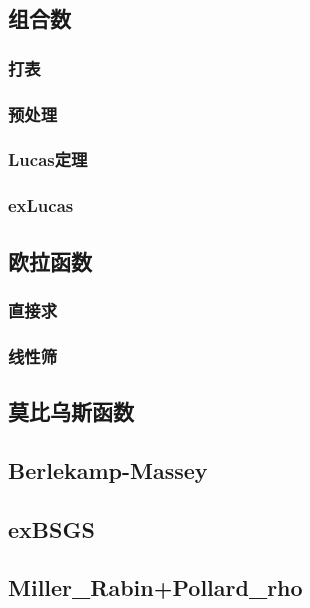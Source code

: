 ﻿\documentclass[a4paper,twocolumn]{article}
\begin{document}
\subsection{组合数}
\subsubsection{打表}

\subsubsection{预处理}

\subsubsection{Lucas定理}

\subsubsection{exLucas}

\subsection{欧拉函数}
\begin{spacing}{1.5}

\end{spacing}
\subsubsection{直接求}

\subsubsection{线性筛}

\subsection{莫比乌斯函数}

\subsection{Berlekamp-Massey}

\subsection{exBSGS}

\subsection{Miller\_Rabin+Pollard\_rho}

\end{document}
